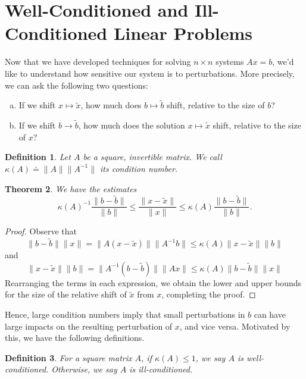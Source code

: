 \documentclass[12pt,reqno]{amsart}
\numberwithin{equation}{section}  %
\newtheorem{theorem}{Theorem}[section]
\newtheorem{definition}[theorem]{Definition}
\begin{document}
\section{Well-Conditioned and Ill-Conditioned Linear Problems}
Now that we have developed techniques for solving $n \times n$
systems $Ax = b$, we'd like to understand how sensitive our system
is to perturbations. More precisely, we can ask the following two questions:
\begin{enumerate}[a)]
\item If we shift $x \mapsto \tilde{x}$, how much does $b \mapsto 
\tilde{b}$ shift, relative to the size of $b$?
\item If we shift $b \to \tilde{b}$, how much does the solution $x \mapsto
\tilde{x}$ shift, relative to the size of $x$?
\end{enumerate}
\begin{definition}
Let $A$ be a square, invertible matrix. We call $\kappa(A) \doteq \| A \| \| A^{-1} \|$
its \emph{condition number}.
\end{definition}
\begin{theorem}
We have the estimates
\begin{equation*}
\kappa(A)^{-1} \frac{\| b - \tilde{b}\|}{\| b\|} \le \frac{\| x - \tilde{x} \|}{\| x \|}
\le \kappa(A) \frac{ \| b - \tilde{b} \|}{ \| b \| }.
\end{equation*}
\end{theorem}
\begin{proof}
Observe that
\begin{equation*}
\| b - \tilde{b} \| \| x \| = \| A(x - \tilde{x})\| \| A^{-1}b \| 
\le \kappa(A) \| x - \tilde{x} \| \| b \|
\end{equation*}
and
\begin{equation*}
\| x - \tilde{x} \| \| b \| = \| A^{-1}(b - \tilde{b})\| \| Ax \| 
\le \kappa(A) \| b - \tilde{b} \| \| x \|
\end{equation*}
Rearranging the terms in each expression, we obtain the lower and upper
bounds for the size of the relative shift of $\tilde{x}$ from $x$, completing
the proof.
\end{proof}
Hence, large condition numbers imply that small perturbations in $b$ can have
large impacts on the resulting perturbation of $x$, and vice versa.
Motivated by this, we have the following definitions.
\begin{definition}
For a square matrix $A$, if $\kappa(A) \le 1$, we say $A$ is well-conditioned.
Otherwise, we say $A$ is ill-conditioned.
\end{definition}
\end{document}
